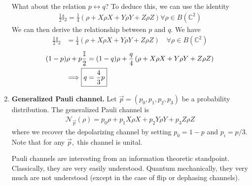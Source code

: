 \documentclass[../../note.tex]{subfiles}
\begin{document}
\begin{enumerate}
What about the relation $p \leftrightarrow q$? To deduce this, we can use the identity 
\begin{align}
    \frac{1}{2}\mathbb{I}_2 = \frac{1}{4} \left(\rho + X \rho X + Y\rho Y + Z \rho Z\right) \forall \rho \in B(\mathbb{C}^2)
\end{align}
We can then derive the relationship between $p$ and $q$. We have
\begin{align}
    \frac{1}{2} \mathbb{I}_2 &= \frac{1}{4}\left(\rho + X\rho X + Y \rho Y + Z\rho Z\right)\quad \forall \rho \in B(\mathbb{C}^2)
\end{align}
\begin{align}
    (1-p) \rho +p \frac{\mathbb{I}}{2}&=(1-q)\rho + \frac{q}{4}\left(\rho + X\rho X + Y\rho Y +Z \rho Z \right)\\
    \implies \Aboxed{q&=\frac{4}{3}p}
\end{align}

\item \textbf{Generalized Pauli channel.} Let $\vec{p}=(p_0,p_1,p_2,p_3)$ be a probability distribution. The generalized Pauli channel is 
\begin{align}
    \mathcal{N}_{\vec{p}}(\rho) = p_0 \rho + p_1 X \rho X + p_2 Y \rho Y + p_3 Z \rho Z
\end{align}
where we recover the depolarizing channel by setting $p_0=1-p$ and $p_i = p/3$. Note that for any $\vec{p},$ this channel is unital.

Pauli channels are interesting from an information theoretic standpoint. Classically, they are very easily understood. Quantum mechanically, they very much are not understood (except in the case of flip or dephasing channels).
\end{enumerate}
\end{document}
